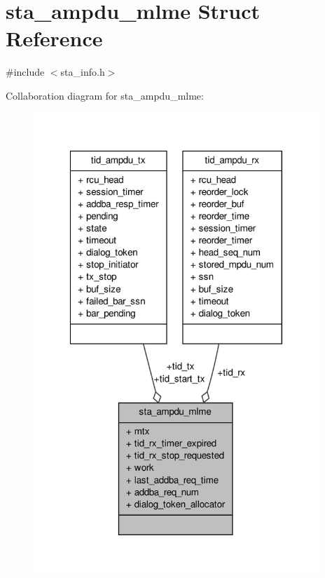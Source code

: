 \hypertarget{structsta__ampdu__mlme}{\section{sta\-\_\-ampdu\-\_\-mlme Struct Reference}
\label{structsta__ampdu__mlme}
}


{\ttfamily \#include $<$sta\-\_\-info.\-h$>$}



Collaboration diagram for sta\-\_\-ampdu\-\_\-mlme\-:
\nopagebreak
\begin{figure}[H]
\begin{center}
\leavevmode
\includegraphics[width=306pt]{structsta__ampdu__mlme__coll__graph}
\end{center}
\end{figure}
